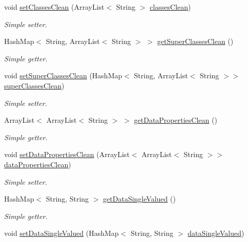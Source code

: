 \begin{DoxyCompactItemize}
void \hyperlink{class_data_base_1_1_tables_abe8fc506b7962781ddf7cddef5a6d585}{setClassesClean} (ArrayList$<$ String $>$ \hyperlink{class_data_base_1_1_tables_a780c97151dcb24984456109f95ebc22d}{classesClean})
\begin{DoxyCompactList}\small\item\em Simple setter. \end{DoxyCompactList}\item 
HashMap$<$ String, ArrayList$<$ String $>$ $>$ \hyperlink{class_data_base_1_1_tables_a035577fea0b42cd1c7206ba4a6f993d2}{getSuperClassesClean} ()
\begin{DoxyCompactList}\small\item\em Simple getter. \end{DoxyCompactList}\item 
void \hyperlink{class_data_base_1_1_tables_a071416b903aa78a5ad3c2e97673e660e}{setSuperClassesClean} (HashMap$<$ String, ArrayList$<$ String $>$$>$ \hyperlink{class_data_base_1_1_tables_a5ec0af78ac892df612bf3ea7a91e37c5}{superClassesClean})
\begin{DoxyCompactList}\small\item\em Simple setter. \end{DoxyCompactList}\item 
ArrayList$<$ ArrayList$<$ String $>$ $>$ \hyperlink{class_data_base_1_1_tables_aa9ea262b8d7d65909acdd07699d743b0}{getDataPropertiesClean} ()
\begin{DoxyCompactList}\small\item\em Simple getter. \end{DoxyCompactList}\item 
void \hyperlink{class_data_base_1_1_tables_ae3c5c0926fd770b2b0282ade507fc51e}{setDataPropertiesClean} (ArrayList$<$ ArrayList$<$ String $>$$>$ \hyperlink{class_data_base_1_1_tables_af9e966f29b9024df669c77cc0d767c78}{dataPropertiesClean})
\begin{DoxyCompactList}\small\item\em Simple setter. \end{DoxyCompactList}\item 
HashMap$<$ String, String $>$ \hyperlink{class_data_base_1_1_tables_ad6dba497a4d71b713fe5c09ea7fffb29}{getDataSingleValued} ()
\begin{DoxyCompactList}\small\item\em Simple getter. \end{DoxyCompactList}\item 
void \hyperlink{class_data_base_1_1_tables_a8a821de16bc3106812b561748f2d0e7e}{setDataSingleValued} (HashMap$<$ String, String $>$ \hyperlink{class_data_base_1_1_tables_a40e2a6f8f60048f0a393e9d03e8fcfd8}{dataSingleValued})

\end{DoxyCompactItemize}
